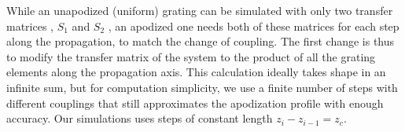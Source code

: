 \documentclass[osajnl,twocolumn,showpacs,superscriptaddress,10pt]{revtex4-1}
\newcommand{\me}{\mathrm{e}}
\begin{document}
While an unapodized (uniform) grating can be simulated with only two transfer matrices , $S_1$ and $S_2$ \cite{shi2013siliconContraDC}, an apodized one needs both of these matrices for each step along the propagation, to match the change of coupling. 
The first change is thus to modify the transfer matrix of the system to the product of all the grating elements along the propagation axis.
This calculation ideally takes shape in an infinite sum, but for computation simplicity, we use a finite number of steps with different couplings that still approximates the apodization profile with enough accuracy. 
Our simulations uses  steps of constant length $z_i-z_{i-1}=z_c$. 




%
\end{document}
